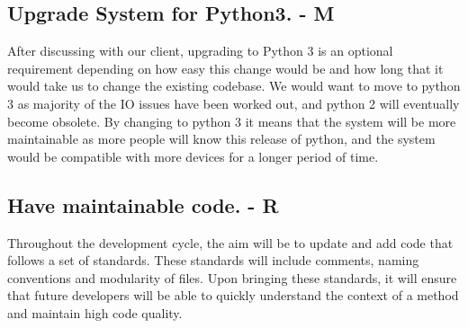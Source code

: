 \documentclass[12pt]{article}
\begin{document}
	\subsection{Upgrade System for Python3. - M}
	After discussing with our client, upgrading to Python 3 is an optional requirement depending on how easy this change would be and how long that it would take us to change the existing codebase. 
We would want to move to python 3 as majority of the IO issues have been worked out, and python 2 will eventually become obsolete. By changing to python 3 it means that the system will be more maintainable as more people will know this release of python, and the system would be compatible with more devices for a longer period of time.

	\subsection{Have maintainable code. - R}
	Throughout the development cycle, the aim will be to update and add code that follows a set of standards. These standards will include comments, naming conventions and modularity of files. Upon bringing these standards, it will ensure that future developers will be able to quickly understand the context of a method and maintain high code quality.
\end{document}
